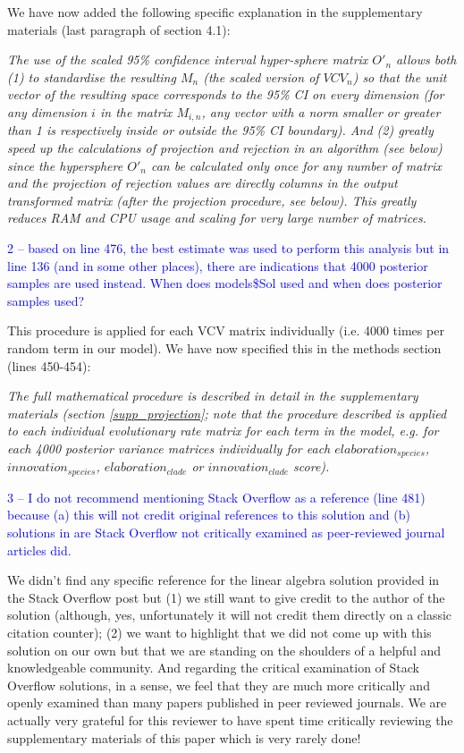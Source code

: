\documentclass[12pt,letterpaper]{article}
\begin{document}
{We have now added the following specific explanation in the supplementary materials (last paragraph of section 4.1):

\noindent\textit{The use of the scaled 95\% confidence interval hyper-sphere matrix $O'_{n}$ allows both (1) to standardise the resulting $M_{n}$ (the scaled version of $VCV_{n}$) so that the unit vector of the resulting space corresponds to the 95\% CI on every dimension (for any dimension $i$ in the matrix $M_{i,n}$, any vector with a norm smaller or greater than 1 is respectively inside or outside the 95\% CI boundary). And (2) greatly speed up the calculations of projection and rejection in an algorithm (see below) since the hypersphere $O'_{n}$ can be calculated only once for any number of matrix and the projection of rejection values are directly columns in the output transformed matrix (after the projection procedure, see below). This greatly reduces RAM and CPU usage and scaling for very large number of matrices.}

\textcolor{blue}{2 – based on line 476, the best estimate was used to perform this analysis but in line 136 (and in some other places), there are indications that 4000 posterior samples are used instead. When does models\$Sol used and when does posterior samples used?}

This procedure is applied for each VCV matrix individually (i.e. 4000 times per random term in our model). We have now specified this in the methods section (lines 450-454):

\noindent\textit{The full mathematical procedure is described in detail in the supplementary materials (section \ref{supp_projection};  note that the procedure described is applied to each individual evolutionary rate matrix for each term in the model, e.g. for each 4000 posterior variance matrices individually for each $elaboration_{species}$, $innovation_{species}$, $elaboration_{clade}$ or $innovation_{clade}$ score).}

\textcolor{blue}{3 – I do not recommend mentioning Stack Overflow as a reference (line 481) because (a) this will not credit original references to this solution and (b) solutions in are Stack Overflow not critically examined as peer-reviewed journal articles did.}

We didn’t find any specific reference for the linear algebra solution provided in the Stack Overflow post but (1) we still want to give credit to the author of the solution (although, yes, unfortunately it will not credit them directly on a classic citation counter); (2) we want to highlight that we did not come up with this solution on our own but that we are standing on the shoulders of a helpful and knowledgeable community. And regarding the critical examination of Stack Overflow solutions, in a sense, we feel that they are much more critically and openly examined than many papers published in peer reviewed journals. We are actually very grateful for this reviewer to have spent time critically reviewing the supplementary materials of this paper which is very rarely done!

}
\end{document}
